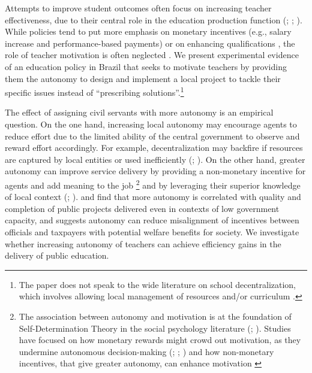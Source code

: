 \documentclass[11pt,a4paper]{article}
\begin{document}

Attempts to improve student outcomes often focus on increasing teacher effectiveness, due to their central role in the education production function (\citealp{chetty2014measuringI, chetty2014measuringII}; \citealp{araujo2016teacher}; \citealp{jackson2018test}). While policies tend to put more emphasis on monetary incentives (e.g., salary increase and performance-based payments) or on enhancing qualifications \citep{evans2016really}, the role of teacher motivation is often neglected \citep{WDR2018}. We present experimental evidence of an education policy in Brazil that seeks to motivate teachers by providing them the autonomy to design and implement a local project to tackle their specific issues instead of ``prescribing solutions''.\footnote{The paper does not speak to the wide literature on school decentralization, which involves allowing local management of resources and/or curriculum \citep{hanushek2013does}.}    


The effect of assigning civil servants with more autonomy is an empirical question. On the one hand, increasing local autonomy may encourage agents to reduce effort due to the limited ability of the central government to observe and reward effort accordingly. For example, decentralization may backfire if resources are captured by local entities or used inefficiently (\citealp{burgess2012political}; \citealp{banerjee2020improving}). On the other hand, greater autonomy can improve service delivery by providing a non-monetary incentive for agents and add meaning to the job \citep{cassar2018nonmonetary}\footnote{The association between autonomy and motivation is at the foundation of Self-Determination Theory in the social psychology literature (\citealp{deci1985intrinsic}; \citealp{ryan2017self}). Studies have focused on how monetary rewards might crowd out motivation, as they undermine autonomous decision-making (\citealp{deci1971effects}; \citealp{amabile1976effects}; \citealp{pritchard1977effects}) and how non-monetary incentives, that give greater autonomy, can enhance motivation \citep{zuckerman1978importance}} and by leveraging their superior knowledge of local context (\citealp{duflo2018value}; \citealp{rogger2018hierarchy}). \cite{rasul2018managementand} and \cite{rasul2018managementof} find that more autonomy is correlated with quality and completion of public projects delivered even in contexts of low government capacity, and \cite{bandiera2020allocation} suggests autonomy can reduce misalignment of incentives between officials and taxpayers with potential welfare benefits for society. We investigate whether increasing autonomy of teachers can achieve efficiency gains in the delivery of public education.
\end{document}
